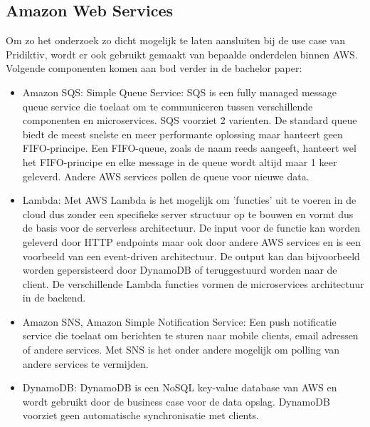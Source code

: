 \subsection{Amazon Web Services}
Om zo het onderzoek zo dicht mogelijk te laten aansluiten bij de use case van Pridiktiv, wordt er ook gebruikt gemaakt van bepaalde onderdelen binnen AWS. Volgende componenten komen aan bod verder in de bachelor paper:
\begin{itemize}
\item Amazon SQS: Simple Queue Service: SQS is een fully managed message queue service die toelaat om te communiceren tussen verschillende componenten en microservices. SQS voorziet 2 varienten. De standard queue biedt de meest snelste en meer performante oplossing maar hanteert geen FIFO-principe. Een FIFO-queue, zoals de naam reeds aangeeft, hanteert wel het FIFO-principe en elke message in de queue wordt altijd maar 1 keer geleverd. Andere AWS services pollen de queue voor nieuwe data.
\item Lambda: Met AWS Lambda is het mogelijk om 'functies' uit te voeren in de cloud dus zonder een specifieke server structuur op te bouwen en vormt dus de basis voor de serverless architectuur. De input voor de functie kan worden geleverd door HTTP endpoints maar ook door andere AWS services en is een voorbeeld van een event-driven architectuur. De output kan dan bijvoorbeeld worden gepersisteerd door DynamoDB of teruggestuurd worden naar de client. De verschillende Lambda functies vormen de microservices architectuur in de backend.
\item Amazon SNS, Amazon Simple Notification Service: Een push notificatie service die toelaat om berichten te sturen naar mobile clients, email adressen of andere services. Met SNS is het onder andere mogelijk om polling van andere services te vermijden.
\item DynamoDB: DynamoDB is een NoSQL key-value database van AWS en wordt gebruikt door de business case voor de data opslag. DynamoDB voorziet geen automatische synchronisatie met clients.
\end{itemize}

